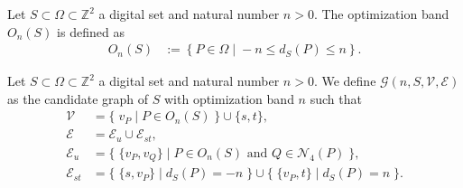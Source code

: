 \documentclass[smallextended]{svjour3}
\begin{document}
\begin{definition}
Let $S \subset \Omega \subset \mathbb{Z}^2$ a digital set and natural number $n>0$. The optimization band $O_n(S)$ is defined as
%
%
\begin{align*}
	O_n(S) &:=\left\{ P \in \Omega \; | \; -n \leq d_{S}(P) \leq n \right\}.
\end{align*}
\end{definition}
%
%
\begin{definition}
Let $S \subset \Omega \subset \mathbb{Z}^2$ a digital set and natural number $n>0$. We define $\mathcal{G}(n,S,\mathcal{V},\mathcal{E})$ as the candidate graph of $S$ with optimization band $n$ such that
%
%
\begin{align*}
\mathcal{V} &= \big\{\; v_P \; | \; P \in O_n(S) \;\} \cup \{s,t \big\}, \\
\mathcal{E} &= \mathcal{E}_u \cup \mathcal{E}_{st}, \\
\mathcal{E}_u &= \big\{ \; \{v_P,v_Q\} \; | \; P \in O_n(S) \text{ and } Q \in \mathcal{N}_4(P) \; \big\}, \\
\mathcal{E}_{st} &= \big\{\; \{s,v_P\} \; | \; d_S(P)=-n \; \big\} \cup \big\{\; \{v_P,t\} \; | \; d_S(P)=n \; \big\}.
\end{align*}
%
%
\end{definition}
\end{document}
